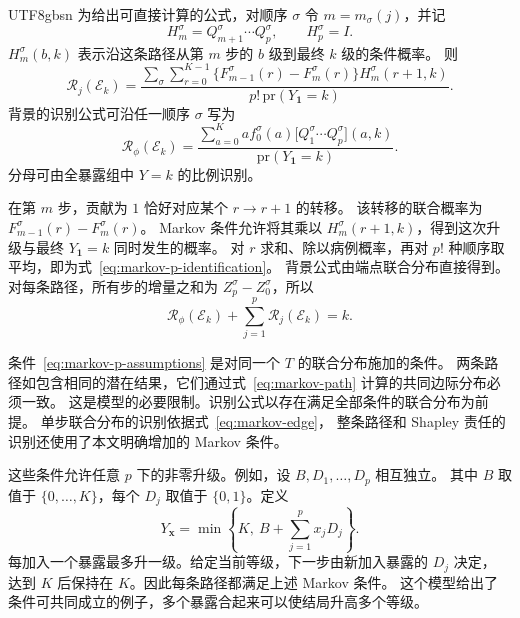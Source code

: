 \documentclass[11pt,a4paper]{article}
\newcommand{\headingweight}{\ifPDFTeX\mdseries\else\bfseries\fi}
\begin{document}
\begin{CJK*}{UTF8}{gbsn}
为给出可直接计算的公式，对顺序 $\sigma$ 令 $m=m_\sigma(j)$，并记
\[
H_m^\sigma=Q_{m+1}^\sigma\cdots Q_p^\sigma,\qquad H_p^\sigma=I.
\]
$H_m^\sigma(b,k)$ 表示沿这条路径从第 $m$ 步的 $b$ 级到最终 $k$ 级的条件概率。
则
\begin{equation}
\mathcal R_j(\mathcal E_k)
=
\frac{
 \displaystyle\sum_\sigma\sum_{r=0}^{K-1}
 \{F_{m-1}^\sigma(r)-F_m^\sigma(r)\}
 H_m^\sigma(r+1,k)}
 {p!\,\mathrm{pr}(Y_{\mathbf1}=k)} .
\label{eq:markov-p-identification}
\end{equation}
背景的识别公式可沿任一顺序 $\sigma$ 写为
\begin{equation}
\mathcal R_\phi(\mathcal E_k)
=
\frac{\displaystyle\sum_{a=0}^{K}
 a f_0^\sigma(a)\big[Q_1^\sigma\cdots Q_p^\sigma\big](a,k)}
 {\mathrm{pr}(Y_{\mathbf1}=k)}.
\label{eq:markov-background}
\end{equation}
分母可由全暴露组中 $Y=k$ 的比例识别。

\medskip
\noindent{\headingweight 证明。}
在第 $m$ 步，贡献为 $1$ 恰好对应某个 $r\to r+1$ 的转移。
该转移的联合概率为 $F_{m-1}^\sigma(r)-F_m^\sigma(r)$。
Markov 条件允许将其乘以 $H_m^\sigma(r+1,k)$，得到这次升级与最终 $Y_{\mathbf1}=k$ 同时发生的概率。
对 $r$ 求和、除以病例概率，再对 $p!$ 种顺序取平均，即为式~\eqref{eq:markov-p-identification}。
背景公式由端点联合分布直接得到。对每条路径，所有步的增量之和为 $Z_p^\sigma-Z_0^\sigma$，所以
\[
\mathcal R_\phi(\mathcal E_k)+\sum_{j=1}^{p}\mathcal R_j(\mathcal E_k)=k.
\]

\medskip
\noindent{\headingweight 共同相容性与模型含义。}
条件~\eqref{eq:markov-p-assumptions} 是对同一个 $T$ 的联合分布施加的条件。
两条路径如包含相同的潜在结果，它们通过式~\eqref{eq:markov-path} 计算的共同边际分布必须一致。
这是模型的必要限制。识别公式以存在满足全部条件的联合分布为前提。
单步联合分布的识别依据式~\eqref{eq:markov-edge}，
整条路径和 Shapley 责任的识别还使用了本文明确增加的 Markov 条件。

这些条件允许任意 $p$ 下的非零升级。例如，设 $B,D_1,\ldots,D_p$ 相互独立。
其中 $B$ 取值于 $\{0,\ldots,K\}$，每个 $D_j$ 取值于 $\{0,1\}$。定义
\[
Y_{\mathbf x}=\min\!\left\{K,\ B+\sum_{j=1}^{p}x_jD_j\right\}.
\]
每加入一个暴露最多升一级。给定当前等级，下一步由新加入暴露的 $D_j$ 决定，
达到 $K$ 后保持在 $K$。因此每条路径都满足上述 Markov 条件。
这个模型给出了条件可共同成立的例子，多个暴露合起来可以使结局升高多个等级。

\ifPDFTeX\end{CJK*}\fi
\end{document}
